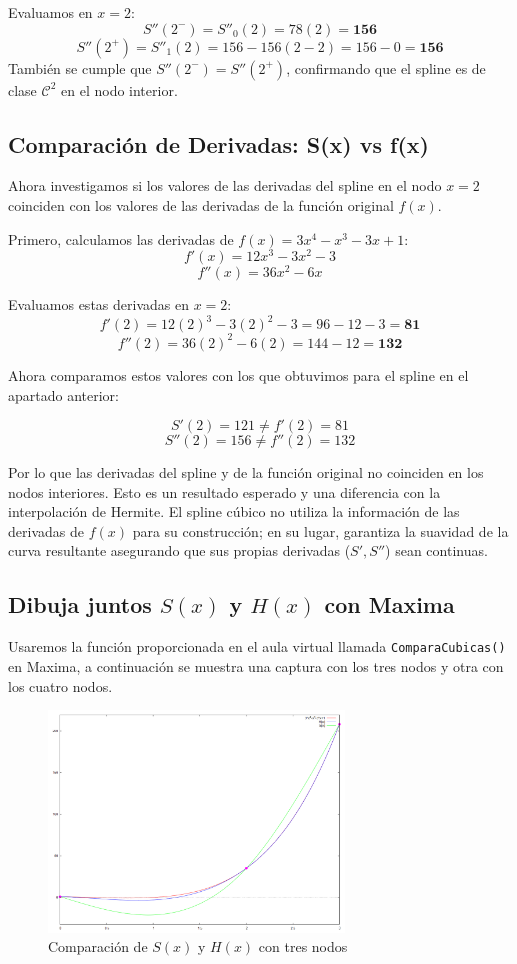 \documentclass{article}
\begin{document}
Evaluamos en $x=2$:
$$ S''(2^-) = S''_0(2) = 78(2) = \mathbf{156} $$
$$ S''(2^+) = S''_1(2) = 156 - 156(2-2) = 156 - 0 = \mathbf{156} $$
También se cumple que $S''(2^-) = S''(2^+)$, confirmando que el spline es de clase $\mathcal{C}^2$ en el nodo interior.



\subsection{Comparación de Derivadas: S(x) vs f(x)}

Ahora investigamos si los valores de las derivadas del spline en el nodo $x=2$ coinciden con los valores de las derivadas de la función original $f(x)$.

Primero, calculamos las derivadas de $f(x) = 3x^4 - x^3 - 3x + 1$:
$$ f'(x) = 12x^3 - 3x^2 - 3 $$
$$ f''(x) = 36x^2 - 6x $$

Evaluamos estas derivadas en $x=2$:
$$ f'(2) = 12(2)^3 - 3(2)^2 - 3 = 96 - 12 - 3 = \mathbf{81} $$
$$ f''(2) = 36(2)^2 - 6(2) = 144 - 12 = \mathbf{132} $$

Ahora comparamos estos valores con los que obtuvimos para el spline en el apartado anterior:

$$ S'(2) = 121 \neq f'(2) = 81 $$
$$ S''(2) = 156 \neq f''(2) = 132 $$

Por lo que las derivadas del spline y de la función original no coinciden en los nodos interiores. Esto es un resultado esperado y una diferencia con la interpolación de Hermite. El spline cúbico no utiliza la información de las derivadas de $f(x)$ para su construcción; en su lugar, garantiza la suavidad de la curva resultante asegurando que sus propias derivadas ($S', S''$) sean continuas.

\subsection{Dibuja juntos $S(x)$ y $H(x)$ con Maxima}

Usaremos la función proporcionada en el aula virtual llamada \verb|ComparaCubicas()| en Maxima, a continuación se muestra una captura con los tres nodos y otra con los cuatro nodos.

\begin{figure}[ht]
    \centering
    \includegraphics[width=0.7\textwidth]{src/comparacubicas.png}
    \caption{Comparación de $S(x)$ y $H(x)$ con tres nodos}
    \label{fig:tres_nodos}
\end{figure}
\end{document}
